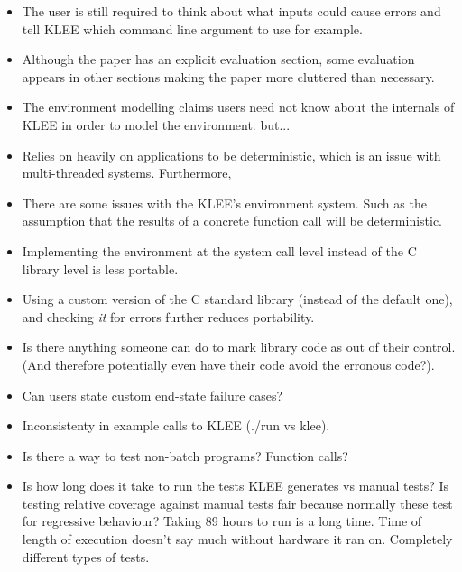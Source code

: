 \documentclass[11pt]{article}
\begin{document}
\begin{itemize}

    \item The user is still required to think about what inputs could cause
    errors and tell KLEE which command line argument to use for example.

    \item Although the paper has an explicit evaluation section, some
    evaluation appears in other sections making the paper more cluttered than
    necessary.

    \item The environment modelling claims users need not know about the
    internals of KLEE in order to model the environment. but...


    \item Relies on heavily on applications to be deterministic, which is an
    issue with multi-threaded systems. Furthermore, %

    \item There are some issues with the KLEE's environment system. Such
    as the assumption that the results of a concrete function call will be
    deterministic. %

    \item Implementing the environment at the system call level instead
    of the C library level is less portable.

    \item Using a custom version of the C standard library (instead of the
    default one), and checking \textit{it} for errors further reduces
    portability.

    \item Is there anything someone can do to mark library code as out of their
    control. (And therefore potentially even have their code avoid the erronous
    code?).

    \item Can users state custom end-state failure cases?

    \item Inconsistenty in example calls to KLEE (./run vs klee).

    \item Is there a way to test non-batch programs? Function calls?

    \item Is how long does it take to run the tests KLEE generates vs manual
    tests? Is testing relative coverage against manual tests fair because
    normally these test for regressive behaviour? Taking 89 hours to run is a
    long time. Time of length of execution doesn't say much without hardware it
    ran on. Completely different types of tests.


\end{itemize}
\end{document}
